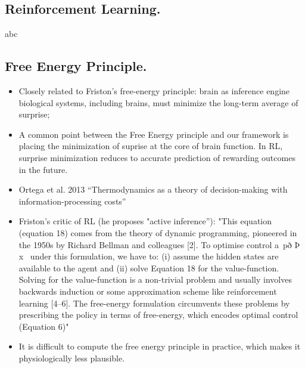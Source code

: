 \documentclass{article} %
\begin{document}
\subsection{Reinforcement Learning.}
abc

\subsection{Free Energy Principle.}
\begin{itemize}
  \item Closely related to Friston's free-energy principle: brain as inference engine
  biological systems, including brains, must minimize the long-term average of surprise;
  \item A common point between the Free Energy principle and our framework
  is placing the minimization of suprise at the core of brain function.
  In RL, surprise minimization reduces to accurate prediction of
  rewarding outcomes in the future.
  \item Ortega et al. 2013 \citep{ortega2013thermodynamics} ``Thermodynamics as a theory of decision-making with information-processing costs''
\item Friston's critic of RL \citep{fristonAIorRL} (he proposes "active inference''): "This equation (equation 18) comes from the theory of dynamic programming,
pioneered in the 1950s by Richard Bellman and colleagues [2]. To
optimise control a~pð Þ x~ under this formulation, we have to: (i)
assume the hidden states are available to the agent and (ii) solve
Equation 18 for the value-function. Solving for the value-function
is a non-trivial problem and usually involves backwards induction
or some approximation scheme like reinforcement learning [4–6].
The free-energy formulation circumvents these problems by
prescribing the policy in terms of free-energy, which encodes
optimal control (Equation 6)"
\item It is difficult to compute the free energy principle
in practice, which makes it physiologically less plausible.
  \end{itemize}
\end{document}

